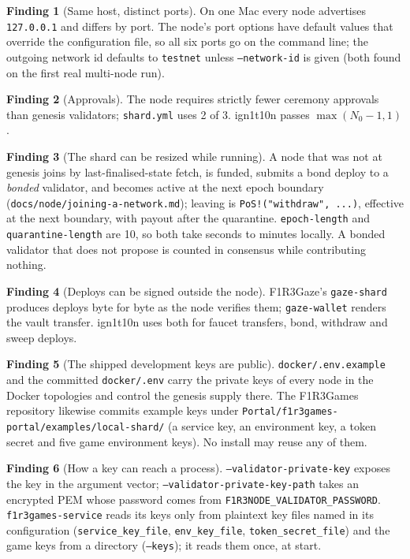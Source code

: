 \documentclass[11pt]{article}
\theoremstyle{definition}
\newtheorem{finding}{Finding}
\theoremstyle{remark}
\newcommand{\code}[1]{\texttt{#1}}
\newcommand{\Gz}{F1R3Gaze}
\newcommand{\Hr}{ign1t10n}
\newcommand{\Gm}{F1R3Games}
\newcommand{\Svc}{\code{f1r3games-service}}
\begin{document}
\begin{finding}[Same host, distinct ports]\label{f:loopback}
On one Mac every node advertises \code{127.0.0.1} and differs by port. The node's
port options have default values that override the configuration file, so all six
ports go on the command line; the outgoing network id defaults to \code{testnet}
unless \code{--network-id} is given (both found on the first real multi-node run).
\end{finding}

\begin{finding}[Approvals]\label{f:approvals}
The node requires strictly fewer ceremony approvals than genesis validators;
\code{shard.yml} uses 2 of 3. \Hr{} passes $\max(N_0 - 1, 1)$.
\end{finding}

\begin{finding}[The shard can be resized while running]\label{f:resize}
A node that was not at genesis joins by last-finalised-state fetch, is funded,
submits a bond deploy to a \emph{bonded} validator, and becomes active at the next
epoch boundary (\code{docs/node/joining-a-network.md}); leaving is
\code{PoS!("withdraw", ...)}, effective at the next boundary, with payout after the
quarantine. \code{epoch-length} and \code{quarantine-length} are 10, so both take
seconds to minutes locally. A bonded validator that does not propose is counted in
consensus while contributing nothing.
\end{finding}

\begin{finding}[Deploys can be signed outside the node]\label{f:signing}
\Gz{}'s \code{gaze-shard} produces deploys byte for byte as the node verifies them;
\code{gaze-wallet} renders the vault transfer. \Hr{} uses both for faucet transfers,
bond, withdraw and sweep deploys.
\end{finding}

\begin{finding}[The shipped development keys are public]\label{f:devkey}
\code{docker/.env.example} and the committed \code{docker/.env} carry the private
keys of every node in the Docker topologies and control the genesis supply there.
The \Gm{} repository likewise commits example keys under
\code{Portal/f1r3games-portal/examples/local-shard/} (a service key, an environment
key, a token secret and five game environment keys). No install may reuse any of
them.
\end{finding}

\begin{finding}[How a key can reach a process]\label{f:keypath}
\code{--validator-private-key} exposes the key in the argument vector;
\code{--validator-private-key-path} takes an encrypted PEM whose password comes from
\code{F1R3NODE\_VALIDATOR\_PASSWORD}. \Svc{} reads its keys only from plaintext
key files named in its configuration (\code{service\_key\_file},
\code{env\_key\_file}, \code{token\_secret\_file}) and the game keys from a
directory (\code{--keys}); it reads them once, at start.
\end{finding}
\end{document}
